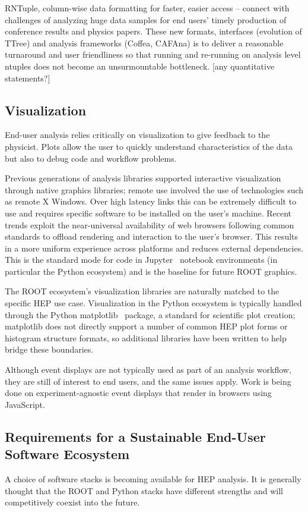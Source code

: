 RNTuple, column-wise data formatting for faster, easier access -- connect with challenges of analyzing huge data samples for end users' timely production of conference results and physics papers. These new formats, interfaces (evolution of TTree) and analysis frameworks (Coffea, CAFAna) is to deliver a reasonable turnaround and user friendliness so that running and re-running on analysis level ntuples does not become an unsurmountable bottleneck. [any quantitative statements?]

\subsection{Visualization}

End-user analysis relies critically on visualization to give feedback to the physicist. Plots allow the user to quickly understand characteristics of the data but also to debug code and workflow problems.

Previous generations of analysis libraries supported interactive visualization through native graphics libraries; remote use involved the use of technologies such as remote X Windows. Over high latency links this can be extremely difficult to use and requires specific software to be installed on the user's machine. Recent trends exploit the near-universal availability of web browsers following common standards to offload rendering and interaction to the user's browser. This results in a more uniform experience across platforms and reduces external dependencies. This is the standard mode for code in Jupyter~\cite{soton403913} notebook environments (in particular the Python ecosystem) and is the baseline for future ROOT graphics.

The ROOT ecosystem's visualization libraries are naturally matched to the specific HEP use case. Visualization in the Python ecosystem is typically handled through the Python matplotlib~\cite{Hunter:2007} package, a standard for scientific plot creation; matplotlib does not directly support a number of common HEP plot forms or histogram structure formats, so additional libraries have been written to help bridge these boundaries.

Although event displays are not typically used as part of an analysis workflow, they are still of interest to end users, and the same issues apply. Work is being done on experiment-agnostic event displays that render in browsers using JavaScript.

\subsection{Requirements for a Sustainable End-User Software Ecosystem}
A choice of software stacks is becoming available for HEP analysis. It is generally thought that the ROOT and Python stacks have different strengths and will competitively coexist into the future.

